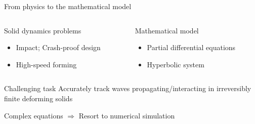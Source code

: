 \begin{withoutheadline}
\begin{frame}{From physics to the mathematical model}
\begin{overprint}
    \begin{columns}
      \begin{column}{0.45\textwidth}
        \begin{block}{Solid dynamics problems}
          \begin{itemize}
          \item[] Impact; Crash-proof design
          \item[] High-speed forming
          \end{itemize}
        \end{block}
      \end{column}
      
      
      \begin{column}{0.55\textwidth}
        \begin{block}{Mathematical model}
          \begin{itemize}
          \item[] Partial differential equations
          \item[] Hyperbolic system
          \end{itemize}
        \end{block}
      \end{column}
    \end{columns}

    \vspace{1.cm}
    \begin{block}{Challenging task}
      \alert{Accurately track waves propagating/interacting in irreversibly finite deforming solids \cite{Wang}}
    \end{block}

    \vspace{0.5cm}
    \begin{block}{Complex equations $\Rightarrow$ Resort to numerical simulation}
      
    \end{block}
  \end{overprint}
\end{frame}\end{withoutheadline}


